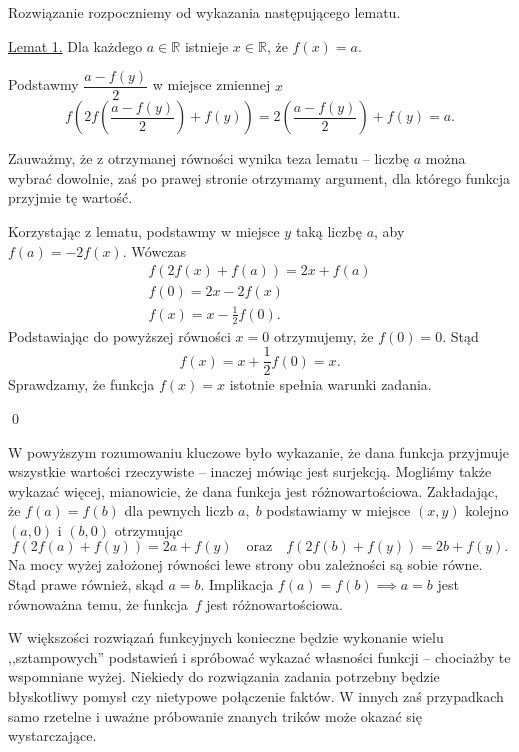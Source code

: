 \newpage


\noindent
Rozwiązanie rozpoczniemy od wykazania następującego lematu.

\vspace{10px}

\noindent
\underline{Lemat 1.} Dla każdego $a \in \mathbb{R}$ istnieje $x \in \mathbb{R}$, że $f(x) = a$.

\vspace{5px}

\noindent
Podstawmy $\dfrac{a - f(y)}{2}$ w miejsce zmiennej $x$
\[
    f\left(2f\left(\frac{a - f(y)}{2}\right) + f(y)\right) = 2\left(\frac{a - f(y)}{2}\right) + f(y) = a.
\]

\noindent
Zauważmy, że z otrzymanej równości wynika teza lematu – liczbę $a$ można wybrać dowolnie, zaś po prawej stronie otrzymamy argument, dla którego funkcja przyjmie tę wartość.

\vspace{10px}

\noindent
Korzystając z lematu, podstawmy w miejsce $y$ taką liczbę $a$, aby $f(a) = -2f(x)$. Wówczas
\begin{gather*}
    f(2f(x) + f(a)) = 2x + f(a) \\
     f(0) = 2x - 2f(x) \\
    f(x) = x  - \frac{1}{2}f(0).
\end{gather*}
Podstawiając do powyższej równości $x = 0$ otrzymujemy, że $f(0) = 0$. Stąd
\[
    f(x) = x + \frac{1}{2}f(0) = x.
\]
Sprawdzamy, że funkcja $f(x) = x$ istotnie spełnia warunki zadania.

\qed

\vspace{10px}

\noindent
W powyższym rozumowaniu kluczowe było wykazanie, że dana funkcja przyjmuje wszystkie wartości rzeczywiste -- inaczej mówiąc jest surjekcją. Mogliśmy także wykazać więcej, mianowicie, że dana funkcja jest różnowartościowa. Zakładając, że $f(a) = f(b)$ dla pewnych liczb $a,\;b$ podstawiamy w miejsce $(x, y)$ kolejno $(a, 0)$ i $(b, 0)$ otrzymując
\[
    f(2f(a) + f(y)) = 2a + f(y) \quad \text{oraz} \quad f(2f(b) + f(y)) = 2b + f(y).
\]
Na mocy wyżej założonej równości lewe strony obu zależności są sobie równe. Stąd prawe również, skąd $a = b$. Implikacja $f(a) = f(b) \implies a = b$ jest równoważna temu, że funkcja~$f$ jest różnowartościowa.

\vspace{10px}

\noindent
W większości rozwiązań funkcyjnych konieczne będzie wykonanie wielu ,,sztampowych'' podstawień i spróbować wykazać własności funkcji -- chociażby te wspomniane wyżej. Niekiedy do rozwiązania zadania potrzebny będzie błyskotliwy pomysł czy nietypowe połączenie faktów. W innych zaś przypadkach samo rzetelne i uważne próbowanie znanych trików może okazać się wystarczające. 

\vspace{10px}
